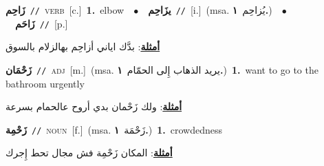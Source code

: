 \documentclass[10pt,a4paper,twoside]{article} %
\begin{document}
\begin{multicols}{2}
{{{{{{{{{\setlength\topsep{0pt}\textbf{\foreignlanguage{arabic}{زَاحِم}}\ {\color{gray}\texttt{//}\color{black}}\ \textsc{verb}\ [c.]\ \textbf{1.}~elbow\ \ $\bullet$\ \ \setlength\topsep{0pt}\textbf{\foreignlanguage{arabic}{يزَاحِم}}\ {\color{gray}\texttt{//}\color{black}}\ [i.]\ \color{gray}(msa. \foreignlanguage{arabic}{يُزاحِم}~\foreignlanguage{arabic}{\textbf{١.}})\color{black}\ \ $\bullet$\ \ \setlength\topsep{0pt}\textbf{\foreignlanguage{arabic}{زَاحَم}}\ {\color{gray}\texttt{//}\color{black}}\ [p.]\  \begin{flushright}\color{gray}\foreignlanguage{arabic}{\textbf{\underline{\foreignlanguage{arabic}{أمثلة}}}: بدَّك اياني أزاحِم بهالزلام بالسوق}\end{flushright}\color{black}} \vspace{2mm}

{\setlength\topsep{0pt}\textbf{\foreignlanguage{arabic}{زَحْمَان}}\ {\color{gray}\texttt{//}\color{black}}\ \textsc{adj}\ [m.]\ \color{gray}(msa. \foreignlanguage{arabic}{يريد الذهاب إِلى الحمّام}~\foreignlanguage{arabic}{\textbf{١.}})\color{black}\ \textbf{1.}~want to go to the bathroom urgently\  \begin{flushright}\color{gray}\foreignlanguage{arabic}{\textbf{\underline{\foreignlanguage{arabic}{أمثلة}}}: ولك زَحْمان بدي أروح عالحمام بسرعة}\end{flushright}\color{black}} \vspace{2mm}

{\setlength\topsep{0pt}\textbf{\foreignlanguage{arabic}{زَحْمِة}}\ {\color{gray}\texttt{//}\color{black}}\ \textsc{noun}\ [f.]\ \color{gray}(msa. \foreignlanguage{arabic}{زَحْمَة}~\foreignlanguage{arabic}{\textbf{١.}})\color{black}\ \textbf{1.}~crowdedness\  \begin{flushright}\color{gray}\foreignlanguage{arabic}{\textbf{\underline{\foreignlanguage{arabic}{أمثلة}}}: المكان زَحْمِة فش مجال تحط إِجرك}\end{flushright}\color{black}} \vspace{2mm}

}}}}}}}}
\end{multicols}
\end{document}
